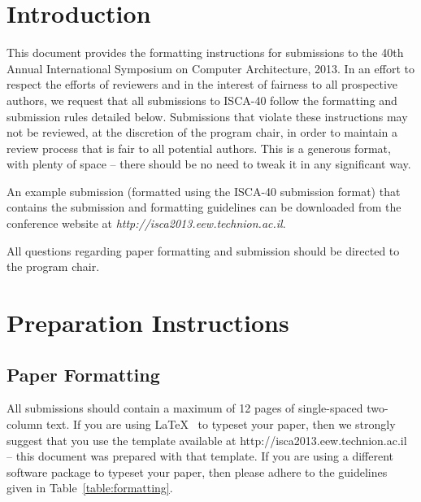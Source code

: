 \section{Introduction}

This document provides the formatting instructions for submissions to the 40th
Annual International Symposium on Computer Architecture,
2013. In an effort to respect the efforts of reviewers and in
the interest of fairness to all prospective authors, we request that all
submissions to ISCA-40 follow the formatting and submission rules detailed
below.  Submissions that violate these instructions may not be
reviewed, at the discretion of the program chair, in order to maintain a review
process that is fair to all potential authors.  This is a generous format,
with plenty of space -- there should be no need to tweak it in any
significant way.

An example submission (formatted using the ISCA-40 submission format) that
contains the submission and formatting guidelines can be downloaded from
the conference website at {\em http://isca2013.eew.technion.ac.il}.

All questions regarding paper formatting and submission should be directed to
the program chair.

\section{Preparation Instructions}

\subsection{Paper Formatting}

All submissions should contain a maximum of 12 pages of single-spaced
two-column text. If you are using \LaTeX~\cite{lamport94} 
to typeset your paper, then we 
strongly suggest
that you use the template available at
http://isca2013.eew.technion.ac.il -- this
document was prepared with that template.  
If you are using a different
software package to typeset your paper, then please adhere to the guidelines
given in Table~\ref{table:formatting}.

